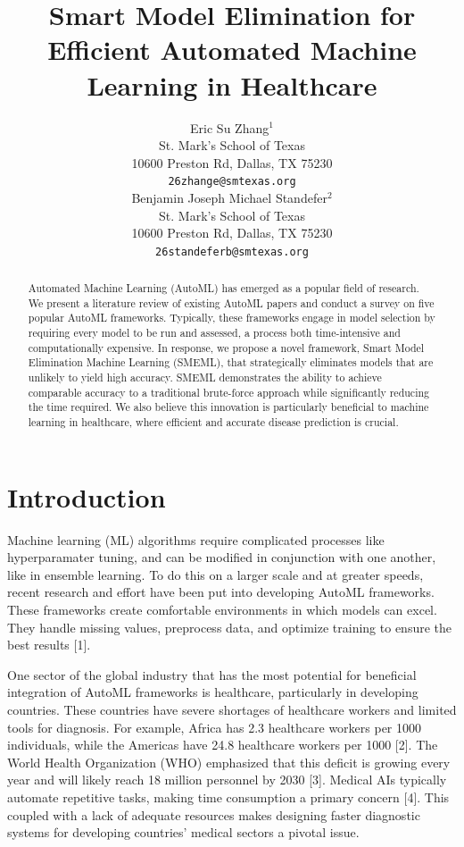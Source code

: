 \documentclass{article}
\title{Smart Model Elimination for Efficient Automated Machine Learning in Healthcare}
\author{%
  Eric Su Zhang$^1$ \\
  St. Mark's School of Texas\\
  10600 Preston Rd, Dallas, TX 75230\\
  \texttt{26zhange@smtexas.org} \\
  \And
  Benjamin Joseph Michael Standefer$^2$ \\
  St. Mark's School of Texas \\
  10600 Preston Rd, Dallas, TX 75230 \\
  \texttt{26standeferb@smtexas.org} \\
}
\begin{document}
\maketitle


\begin{abstract}
  Automated Machine Learning (AutoML) has emerged as a popular field of research. We present a literature review of existing AutoML papers and conduct a survey on five popular AutoML frameworks. Typically, these frameworks engage in model selection by requiring every model to be run and assessed, a process both time-intensive and computationally expensive. In response, we propose a novel framework, Smart Model Elimination Machine Learning (SMEML), that strategically eliminates models that are unlikely to yield high accuracy. SMEML demonstrates the ability to achieve comparable accuracy to a traditional brute-force approach while significantly reducing the time required. We also believe this innovation is particularly beneficial to machine learning in healthcare, where efficient and accurate disease prediction is crucial. 
\end{abstract}


\section{Introduction}

Machine learning (ML) algorithms require complicated processes like hyperparamater tuning, and can be modified in conjunction with one another, like in ensemble learning. To do this on a larger scale and at greater speeds, recent research and effort have been put into developing AutoML frameworks. These frameworks create comfortable environments in which models can excel. They handle missing values, preprocess data, and optimize training to ensure the best results [1].

One sector of the global industry that has the most potential for beneficial integration of AutoML frameworks is healthcare, particularly in developing countries. These countries have severe shortages of healthcare workers and limited tools for diagnosis. For example, Africa has 2.3 healthcare workers per 1000 individuals, while the Americas have 24.8 healthcare workers per 1000 [2]. The World Health Organization (WHO) emphasized that this deficit is growing every year and will likely reach 18 million personnel by 2030 [3]. Medical AIs typically automate repetitive tasks, making time consumption a primary concern [4]. This coupled with a lack of adequate resources makes designing faster diagnostic systems for developing countries' medical sectors a pivotal issue. 
\end{document}
